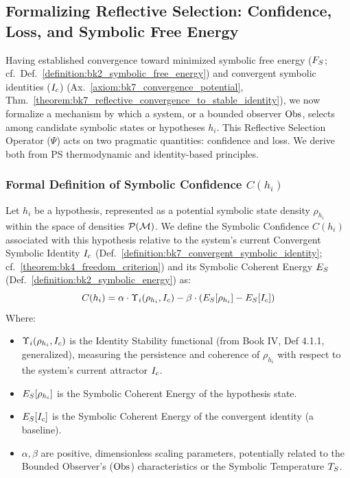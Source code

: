 \subsection{Formalizing Reflective Selection: Confidence, Loss, and Symbolic Free Energy}
\label{subsec:bk7_formalizing_reflective_selection_confidence_loss_and_symbolic_}
Having established convergence toward minimized symbolic free energy
(\(F_S\); cf.~Def.~\ref{definition:bk2_symbolic_free_energy}) and
convergent symbolic identities (\(I_c\))
(Ax.~\ref{axiom:bk7_convergence_potential},
Thm.~\ref{theorem:bk7_reflective_convergence_to_stable_identity}), we now
formalize a mechanism by which a system, or a bounded observer \(\mathrm{Obs}\),
selects among candidate symbolic states or hypotheses \(h_i\).
This Reflective Selection Operator (\(\Psi\)) acts on two pragmatic quantities:
confidence and loss.
We derive both from PS thermodynamic and identity-based principles.
\subsubsection{Formal Definition of Symbolic Confidence \(C(h_i)\)}
\label{subsubsec:bk7_formal_definition_of_symbolic_confidence_ch_i}
Let \(h_i\) be a hypothesis, represented as a potential symbolic state density \(\rho_{h_i}\) within the space of densities \(\mathcal{P}(\mathcal{M})\). We define the Symbolic Confidence \(C(h_i)\) associated with this hypothesis relative to the system's current Convergent Symbolic Identity \(I_c\) (Def.~\ref{definition:bk7_convergent_symbolic_identity}; cf.~\ref{theorem:bk4_freedom_criterion}) and its Symbolic Coherent Energy \(E_S\) (Def.~\ref{definition:bk2_symbolic_energy}) as:
\begin{equation}
C(h_i) = \alpha \cdot \Upsilon_i(\rho_{h_i}, I_c) - \beta \cdot (E_S[\rho_{h_i}] - E_S[I_c])
\label{eq:bk7_symbolic_confidence}
\end{equation}
Where:
\begin{itemize}
    \item \(\Upsilon_i(\rho_{h_i}, I_c)\) is the Identity Stability functional (from Book IV, Def 4.1.1, generalized), measuring the persistence and coherence of \(\rho_{h_i}\) with respect to the system's current attractor \(I_c\).
    \item \(E_S[\rho_{h_i}]\) is the Symbolic Coherent Energy of the hypothesis state.
    \item \(E_S[I_c]\) is the Symbolic Coherent Energy of the convergent identity (a baseline).
    \item \(\alpha, \beta\) are positive, dimensionless scaling parameters, potentially related to the Bounded Observer's ($\mathrm{Obs}$) characteristics or the Symbolic Temperature \(T_S\).
\end{itemize}

